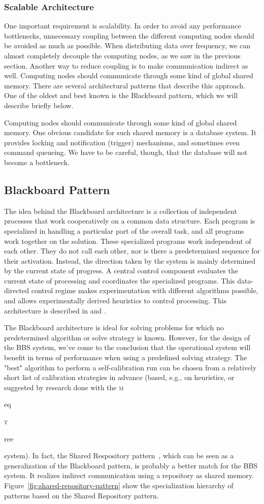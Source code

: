 \documentclass[10pt]{lofar}
\newcommand{\meqtree}{\textsc{m}\begin{footnotesize}eq\end{footnotesize}\textsc{t}\begin{footnotesize}ree\end{footnotesize}\xspace}
\begin{document}
\subsubsection{Scalable Architecture}
\label{subsubsec:scalable-architecture}
One important requirement is scalability. In order to avoid any performance
bottlenecks, unnecessary coupling between the different computing nodes should
be avoided as much as possible. When distributing data over frequency, we can
almost completely decouple the computing nodes, as we saw in the previous
section. Another way to reduce coupling is to make communication indirect as
well. Computing nodes should communicate through some kind of global shared
memory. There are several architectural patterns that describe this
approach. One of the oldest and best known is the Blackboard pattern, which we
will describe briefly below.

Computing nodes should communicate through some kind of global shared
memory. One obvious candidate for such shared memory is a database system. It
provides locking and notification (trigger) mechanisms, and sometimes even
command queueing. We have to be careful, though, that the database will not
become a bottleneck.

\subsection{Blackboard Pattern}
\label{subsec:blackboard}
The idea behind the Blackboard architecture is a collection of independent
processes that work cooperatively on a common data structure. Each program is
specialized in handling a particular part of the overall task, and all
programs work together on the solution. These specialized programs work
independent of each other. They do not call each other, nor is there a
predetermined sequence for their activation. Instead, the direction taken by
the system is mainly determined by the current state of progress. A central
control component evaluates the current state of processing and coordinates
the specialized programs. This data-directed control regime makes
experimentation with different algorithms possible, and allows experimentally
derived heuristics to control processing. This architecture is described in
\cite{Buschmann1996} and \cite{LOFAR-ASTRON-SDD-002}.

The Blackboard architecture is ideal for solving problems for which no
predetermined algorithm or solve strategy is known. However, for the design of
the BBS system, we've come to the conclusion that the operational system will
benefit in terms of performance when using a predefined solving strategy. The
"best" algorithm to perform a self-calibration run can be chosen from a
relatively short list of calibration strategies in advance (based, e.g., on
heuristics, or suggested by research done with the \meqtree system).  In fact,
the Shared Respository pattern~\cite{Lalanda1998}, which can be seen as a
generalization of the Blackboard pattern, is probably a better match for the
BBS system. It realizes indirect communication using a repository as shared
memory. Figure~\ref{fig:shared-repository-pattern} show the specialization
hierarchy of patterns based on the Shared Repository pattern.
\end{document}
